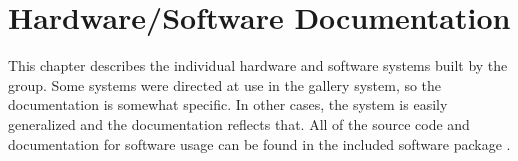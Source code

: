 \chapter{Hardware/Software Documentation}
This chapter describes the individual hardware and software systems built by the group. Some systems were directed at use in the gallery system, so the documentation is somewhat specific. In other cases, the system is easily generalized and the documentation reflects that. All of the source code and documentation for software usage can be found in the included software package \cite{PACK}.





